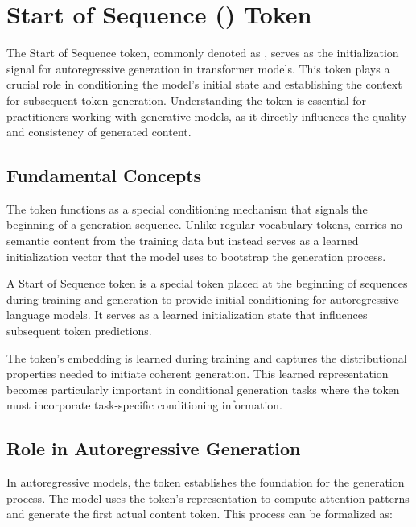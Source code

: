 
\section{Start of Sequence (\sos{}) Token}

The Start of Sequence token, commonly denoted as \sos{}, serves as the initialization signal for autoregressive generation in transformer models. This token plays a crucial role in conditioning the model's initial state and establishing the context for subsequent token generation. Understanding the \sos{} token is essential for practitioners working with generative models, as it directly influences the quality and consistency of generated content.

\subsection{Fundamental Concepts}

The \sos{} token functions as a special conditioning mechanism that signals the beginning of a generation sequence. Unlike regular vocabulary tokens, \sos{} carries no semantic content from the training data but instead serves as a learned initialization vector that the model uses to bootstrap the generation process.

\begin{definition}
A Start of Sequence token \sos{} is a special token placed at the beginning of sequences during training and generation to provide initial conditioning for autoregressive language models. It serves as a learned initialization state that influences subsequent token predictions.
\end{definition}

The \sos{} token's embedding is learned during training and captures the distributional properties needed to initiate coherent generation. This learned representation becomes particularly important in conditional generation tasks where the \sos{} token must incorporate task-specific conditioning information.

\subsection{Role in Autoregressive Generation}

In autoregressive models, the \sos{} token establishes the foundation for the generation process. The model uses the \sos{} token's representation to compute attention patterns and generate the first actual content token. This process can be formalized as:

